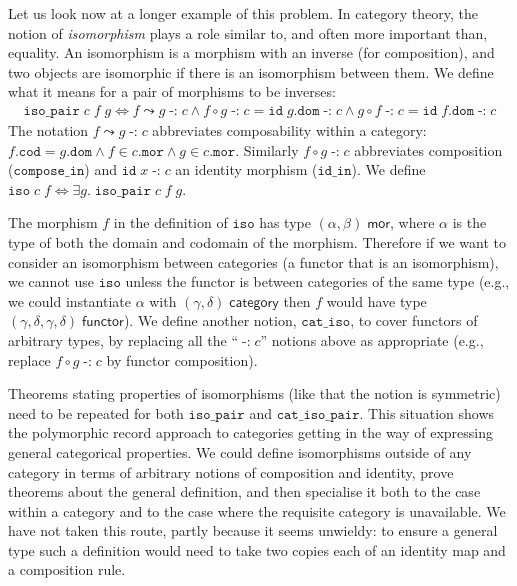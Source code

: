 \documentclass[twoside,titlepage,11pt]{article}
\begin{document}
Let us look now at a longer example of this problem.
In category theory, the notion of \emph{isomorphism} plays a role similar to, and often more important than, equality.
An isomorphism is a morphism with an inverse (for composition), and two objects are isomorphic if there is an isomorphism between them.
We define what it means for a pair of morphisms to be inverses:
\begin{align*}
\mathtt{iso\_pair}\;c\;f\;g\iff f\leadsto g\operatorname{\mathtt{-:}}c\land f\circ g\operatorname{\mathtt{-:}}c=\mathtt{id}\;g.\mathtt{dom}\operatorname{\mathtt{-:}}c\land g\circ f\operatorname{\mathtt{-:}}c=\mathtt{id}\;f.\mathtt{dom}\operatorname{\mathtt{-:}}c
\end{align*}
The notation $f\leadsto g\operatorname{\mathtt{-:}}c$ abbreviates composability within a category: $f.\mathtt{cod}=g.\mathtt{dom}\land f\in c.\mathtt{mor}\land g\in c.\mathtt{mor}$.
Similarly $f\circ g\operatorname{\mathtt{-:}}c$ abbreviates composition ($\mathtt{compose\_in}$) and $\mathtt{id}\;x\operatorname{-:}c$ an identity morphism ($\mathtt{id\_in}$).
We define $\mathtt{iso}\;c\;f \iff\exists{g}.\;\mathtt{iso\_pair}\;c\;f\;g$.

The morphism $f$ in the definition of $\mathtt{iso}$ has type $(\alpha,\beta)\;\mathsf{mor}$, where $\alpha$ is the type of both the domain and codomain of the morphism.
Therefore if we want to consider an isomorphism between categories (a functor that is an isomorphism), we cannot use $\mathtt{iso}$ unless the functor is between categories of the same type (e.g., we could instantiate $\alpha$ with $(\gamma,\delta)\;\mathsf{category}$ then $f$ would have type $(\gamma,\delta,\gamma,\delta)\;\mathsf{functor}$).
We define another notion, $\mathtt{cat\_iso}$, to cover functors of arbitrary types, by replacing all the ``$\operatorname{\mathtt{-:}}c$'' notions above as appropriate (e.g., replace $f\circ g\operatorname{\mathtt{-:}}c$ by functor composition).

Theorems stating properties of isomorphisms (like that the notion is symmetric) need to be repeated for both $\mathtt{iso\_pair}$ and $\mathtt{cat\_iso\_pair}$. 
This situation shows the polymorphic record approach to categories getting in the way of expressing general categorical properties.
We could define isomorphisms outside of any category in terms of arbitrary notions of composition and identity, prove theorems about the general definition, and then specialise it both to the case within a category and to the case where the requisite category is unavailable.
We have not taken this route, partly because it seems unwieldy: to ensure a general type such a definition would need to take two copies each of an identity map and a composition rule.
\end{document}
